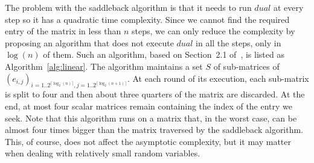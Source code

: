 \documentclass[letterpaper]{article} %
\begin{document}
The problem with the saddleback algorithm is that it needs to run $dual$ at every step so it has a quadratic time complexity. Since we cannot find the required entry of the matrix in less than $n$ steps, we can only reduce the complexity by proposing an algorithm that does not execute $dual$ in all the steps, only in $\log(n)$ of them. Such an algorithm, based on Section~2.1 of~\cite{Fournier2011}, is listed as Algorithm~\ref{alg:linear}. The algorithm maintains a set $S$ of sub-matrices of $(e_{i,j})_{i=1..2^{\lceil \log_2(n) \rceil},j=1..2^{\lceil \log_2(n+1) \rceil}}$. At each round of its execution, each sub-matrix is split to four and then about three quarters of the matrix are discarded. At the end, at most four scalar matrices remain containing the index of the entry we seek. Note that this algorithm runs on a matrix that, in the worst case, can be almost four times bigger than the matrix traversed by the saddleback algorithm. This, of course, does not affect the asymptotic  complexity, but it may matter when dealing with relatively small random variables.
\end{document}
